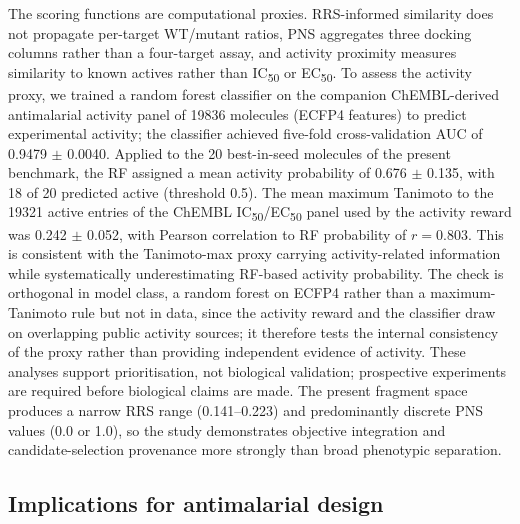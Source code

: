 \documentclass[10pt,a4paper]{article}
\begin{document}
The scoring functions are computational proxies. RRS-informed similarity does not propagate per-target WT/mutant ratios, PNS aggregates three docking columns rather than a four-target assay, and activity proximity measures similarity to known actives rather than IC\textsubscript{50} or EC\textsubscript{50}. To assess the activity proxy, we trained a random forest classifier on the companion ChEMBL-derived antimalarial activity panel of \num{19836} molecules (ECFP4 features) to predict experimental activity; the classifier achieved five-fold cross-validation AUC of \num{0.9479} $\pm$ \num{0.0040}. Applied to the \num{20} best-in-seed molecules of the present benchmark, the RF assigned a mean activity probability of \num{0.676} $\pm$ \num{0.135}, with \num{18} of \num{20} predicted active (threshold \num{0.5}). The mean maximum Tanimoto to the \num{19321} active entries of the ChEMBL IC\textsubscript{50}/EC\textsubscript{50} panel used by the activity reward was \num{0.242} $\pm$ \num{0.052}, with Pearson correlation to RF probability of $r = \num{0.803}$. This is consistent with the Tanimoto-max proxy carrying activity-related information while systematically underestimating RF-based activity probability. The check is orthogonal in model class, a random forest on ECFP4 rather than a maximum-Tanimoto rule but not in data, since the activity reward and the classifier draw on overlapping public activity sources; it therefore tests the internal consistency of the proxy rather than providing independent evidence of activity. These analyses support prioritisation, not biological validation; prospective experiments are required before biological claims are made. The present fragment space produces a narrow RRS range (\num{0.141}--\num{0.223}) and predominantly discrete PNS values (\num{0.0} or \num{1.0}), so the study demonstrates objective integration and candidate-selection provenance more strongly than broad phenotypic separation.

\subsection{Implications for antimalarial design}
\end{document}

